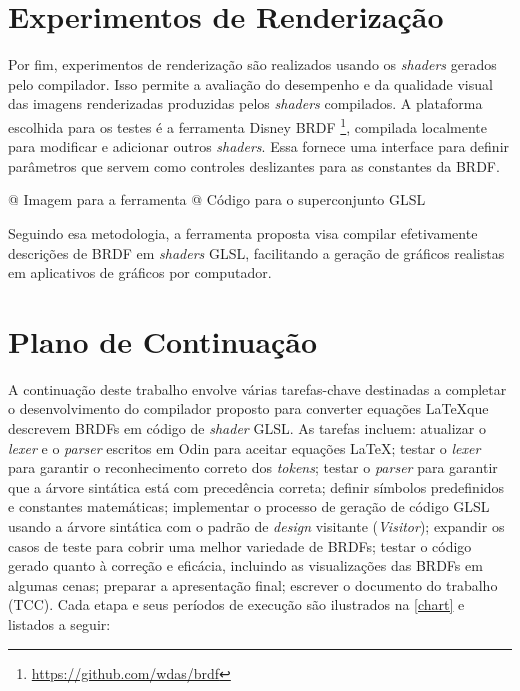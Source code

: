 \documentclass[english, 
               brazil, 
               bsc] %
               {dcomp-abntex2}
\begin{document}
\section{Experimentos de Renderização}

Por fim, experimentos de renderização são realizados usando os \textit{shaders} gerados pelo compilador. Isso permite a avaliação do desempenho e da qualidade visual das imagens renderizadas produzidas pelos \textit{shaders} compilados. A plataforma escolhida para os testes é a ferramenta Disney BRDF \footnote{\url{https://github.com/wdas/brdf}}, compilada localmente para modificar e adicionar outros \textit{shaders}. Essa fornece uma interface para definir parâmetros que servem como controles deslizantes para as constantes da BRDF.

@ Imagem para a ferramenta
@ Código para o superconjunto GLSL

Seguindo esa metodologia, a ferramenta proposta visa compilar efetivamente descrições de BRDF em \textit{shaders} GLSL, facilitando a geração de gráficos realistas em aplicativos de gráficos por computador.

\section{Plano de Continuação} \label{continuacao}

A continuação deste trabalho envolve várias tarefas-chave destinadas a completar o desenvolvimento do compilador proposto para converter equações \LaTeX  que descrevem BRDFs em código de \textit{shader} GLSL. As tarefas incluem: atualizar o \textit{lexer} e o \textit{parser} escritos em Odin para aceitar equações \LaTeX; testar o \textit{lexer} para garantir o reconhecimento correto dos \textit{tokens}; testar o \textit{parser} para garantir que a árvore sintática está com precedência correta; definir símbolos predefinidos e constantes matemáticas; implementar o processo de geração de código GLSL usando a árvore sintática com o padrão de \textit{design} visitante (\textit{Visitor}); expandir os casos de teste para cobrir uma melhor variedade de BRDFs; testar o código gerado quanto à correção e eficácia, incluindo as visualizações das BRDFs em algumas cenas; preparar a apresentação final; escrever o documento do trabalho (TCC). Cada etapa e seus períodos de execução são ilustrados na \autoref{chart} e listados a seguir:
\end{document}
